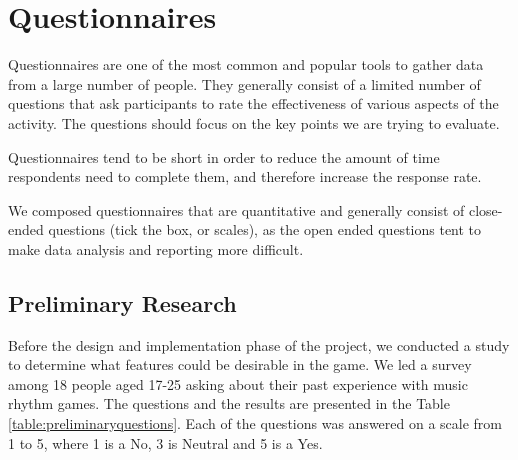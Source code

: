 \section{Questionnaires}
Questionnaires are one of the most common and popular tools to gather data from a large number of people. They generally consist of a limited number of questions that ask participants to rate the effectiveness of various aspects of the activity. The questions should focus on the key points we are trying to evaluate. 

Questionnaires tend to be short in order to reduce the amount of time respondents need to complete them, and therefore increase the response rate. 

We composed questionnaires that are quantitative and generally consist of close-ended questions (tick the box, or scales), as the open ended questions tent to make data analysis and reporting more difficult.

\subsection*{Preliminary Research}

Before the design and implementation phase of the project, we conducted a study to determine what features could be desirable in the game. We led a survey among 18 people aged 17-25 asking about their past experience with music rhythm games. 
The questions and the results are presented in the Table \ref{table:preliminaryquestions}. Each of the questions was answered on a scale from 1 to 5, where 1 is a No,  3 is Neutral and 5 is a Yes.

